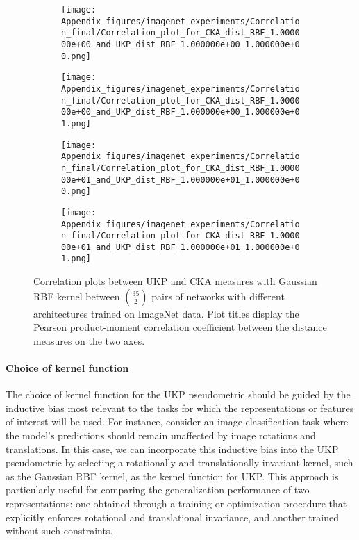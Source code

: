 \documentclass{article} %
\newcommand{\metricstname}{UKP }
\theoremstyle{plain}
\begin{document}
\begin{figure}[h!]
    \centering
    \begin{subfigure}[b]{0.45\textwidth}
        \texttt{[image: Appendix\_figures/imagenet\_experiments/Correlation\_final/Correlation\_plot\_for\_CKA\_dist\_RBF\_1.000000e+00\_and\_UKP\_dist\_RBF\_1.000000e+00\_1.000000e+00.png]}
    \end{subfigure}
    \hfill
    \begin{subfigure}[b]{0.45\textwidth}
        \texttt{[image: Appendix\_figures/imagenet\_experiments/Correlation\_final/Correlation\_plot\_for\_CKA\_dist\_RBF\_1.000000e+00\_and\_UKP\_dist\_RBF\_1.000000e+00\_1.000000e+01.png]}
    \end{subfigure}
    
    \vspace{0.5cm}  %
    
    \begin{subfigure}[b]{0.45\textwidth}
        \texttt{[image: Appendix\_figures/imagenet\_experiments/Correlation\_final/Correlation\_plot\_for\_CKA\_dist\_RBF\_1.000000e+01\_and\_UKP\_dist\_RBF\_1.000000e+01\_1.000000e+00.png]}
    \end{subfigure}
    \hfill
    \begin{subfigure}[b]{0.45\textwidth}
        \texttt{[image: Appendix\_figures/imagenet\_experiments/Correlation\_final/Correlation\_plot\_for\_CKA\_dist\_RBF\_1.000000e+01\_and\_UKP\_dist\_RBF\_1.000000e+01\_1.000000e+01.png]}
    \end{subfigure}
    
    \caption{Correlation plots between UKP and CKA measures with Gaussian RBF kernel between $\binom{35}{2}$ pairs of networks with different architectures trained on  ImageNet data. Plot titles display the Pearson product-moment correlation coefficient between the distance measures on the two axes.}
    \label{ImageNet correlation plots UKP CKA}
\end{figure}

\paragraph{Choice of kernel function} The choice of kernel function for the \metricstname pseudometric should be guided by the inductive bias most relevant to the tasks for which the representations or features of interest will be used. For instance, consider an image classification task where the model's predictions should remain unaffected by image rotations and translations. In this case, we can incorporate this inductive bias into the \metricstname pseudometric by selecting a rotationally and translationally invariant kernel, such as the Gaussian RBF kernel, as the kernel function for UKP. This approach is particularly useful for comparing the generalization performance of two representations: one obtained through a training or optimization procedure that explicitly enforces rotational and translational invariance, and another trained without such constraints.
\end{document}
